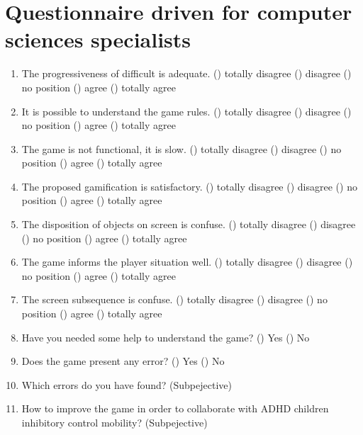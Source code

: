 \documentclass{article}
\begin{document}
\section{Questionnaire driven for computer sciences specialists}
\label{ap:sec:cc}

\begin{enumerate}
	\item The progressiveness of difficult is adequate.
	\subitem () totally disagree
	\subitem () disagree
	\subitem () no position
	\subitem () agree
	\subitem () totally agree

	\item  It is possible to understand the game rules.
	\subitem () totally disagree
	\subitem () disagree
	\subitem () no position
	\subitem () agree
	\subitem () totally agree
	
	\item The game is not functional, it is slow.
	\subitem () totally disagree
	\subitem () disagree
	\subitem () no position
	\subitem () agree
	\subitem () totally agree

	\item The proposed gamification is satisfactory.
	\subitem () totally disagree
	\subitem () disagree
	\subitem () no position
	\subitem () agree
	\subitem () totally agree
 
	\item The disposition of objects on screen is confuse.
	\subitem () totally disagree
	\subitem () disagree
	\subitem () no position
	\subitem () agree
	\subitem () totally agree
	
	\item The game informs the player situation well.
	\subitem () totally disagree
	\subitem () disagree
	\subitem () no position
	\subitem () agree
	\subitem () totally agree
	
	\item The screen subsequence is confuse.
		\subitem () totally disagree
		\subitem () disagree
		\subitem () no position
		\subitem () agree
		\subitem () totally agree

	\item Have you needed some help to understand the game?
	\subitem () Yes
	\subitem () No
	\item Does the game present any error?
	\subitem () Yes
	\subitem () No	\item Which errors do you have found? (Subpejective)
	
	\item How to improve the game in order to collaborate with ADHD children inhibitory control mobility? 
	(Subpejective)
	
\end{enumerate}
\end{document}
